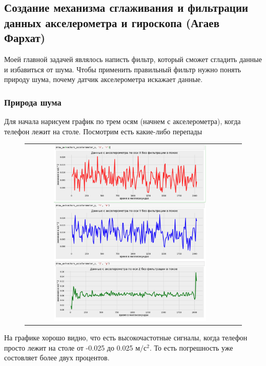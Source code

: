 
\subsection{Создание механизма 
сглаживания и фильтрации данных акселерометра и 
гироскопа (Агаев Фархат)}
Моей главной задачей являлось написть фильтр, 
который сможет сгладить данные и избавиться от шума.
Чтобы применить правильный фильтр нужно понять природу шума, 
почему датчик акселерометра искажает данные.
\subsubsection{Природа шума}
Для начала нарисуем график по трем осям (начнем с акселерометра), 
когда телефон лежит на столе. Посмотрим есть какие-либо перепады

\begin{figure}[H]
    \begin{center}
        \begin{tabular}{cc}
            \includegraphics[width=0.75\textwidth]{farim/shakeee} & 
        \end{tabular}
    \end{center}
\end{figure}

На графике хорошо видно, что есть высокочастотные сигналы, 
когда телефон просто лежит на столе от -0.025  до 0.025 $\text{м}/\text{с}^2$. То есть
погрешность уже состовляет более двух процентов. 

